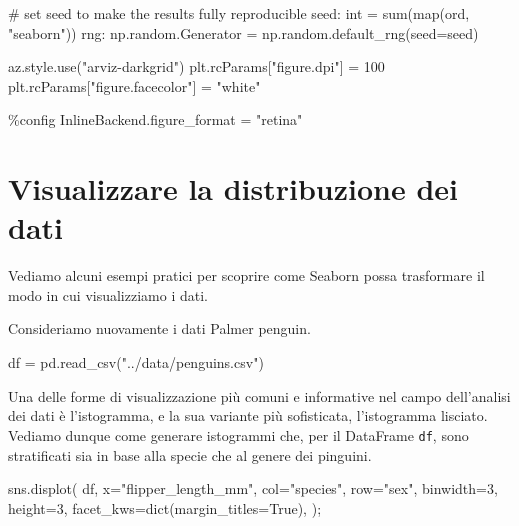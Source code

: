\documentclass[
  letterpaper,
  krantz2]{{[}./krantz{]}}
\newenvironment{Shaded}{\begin{snugshade}}{\end{snugshade}}
\newcommand{\BuiltInTok}[1]{\textcolor[rgb]{0.00,0.23,0.31}{#1}}
\newcommand{\CommentTok}[1]{\textcolor[rgb]{0.37,0.37,0.37}{#1}}
\newcommand{\DecValTok}[1]{\textcolor[rgb]{0.68,0.00,0.00}{#1}}
\newcommand{\NormalTok}[1]{\textcolor[rgb]{0.00,0.23,0.31}{#1}}
\newcommand{\OperatorTok}[1]{\textcolor[rgb]{0.37,0.37,0.37}{#1}}
\newcommand{\StringTok}[1]{\textcolor[rgb]{0.13,0.47,0.30}{#1}}
\newcommand{\VariableTok}[1]{\textcolor[rgb]{0.07,0.07,0.07}{#1}}
\begin{document}
\begin{Shaded}
\begin{Highlighting}[]
\CommentTok{\# set seed to make the results fully reproducible}
\NormalTok{seed: }\BuiltInTok{int} \OperatorTok{=} \BuiltInTok{sum}\NormalTok{(}\BuiltInTok{map}\NormalTok{(}\BuiltInTok{ord}\NormalTok{, }\StringTok{"seaborn"}\NormalTok{))}
\NormalTok{rng: np.random.Generator }\OperatorTok{=}\NormalTok{ np.random.default\_rng(seed}\OperatorTok{=}\NormalTok{seed)}

\NormalTok{az.style.use(}\StringTok{"arviz{-}darkgrid"}\NormalTok{)}
\NormalTok{plt.rcParams[}\StringTok{"figure.dpi"}\NormalTok{] }\OperatorTok{=} \DecValTok{100}
\NormalTok{plt.rcParams[}\StringTok{"figure.facecolor"}\NormalTok{] }\OperatorTok{=} \StringTok{"white"}

\OperatorTok{\%}\NormalTok{config InlineBackend.figure\_format }\OperatorTok{=} \StringTok{"retina"}
\end{Highlighting}
\end{Shaded}

\section{Visualizzare la distribuzione dei
dati}\label{visualizzare-la-distribuzione-dei-dati}

Vediamo alcuni esempi pratici per scoprire come Seaborn possa
trasformare il modo in cui visualizziamo i dati.

Consideriamo nuovamente i dati Palmer penguin.

\begin{Shaded}
\begin{Highlighting}[]
\NormalTok{df }\OperatorTok{=}\NormalTok{ pd.read\_csv(}\StringTok{"../data/penguins.csv"}\NormalTok{)}
\end{Highlighting}
\end{Shaded}

Una delle forme di visualizzazione più comuni e informative nel campo
dell'analisi dei dati è l'istogramma, e la sua variante più sofisticata,
l'istogramma lisciato. Vediamo dunque come generare istogrammi che, per
il DataFrame \texttt{df}, sono stratificati sia in base alla specie che
al genere dei pinguini.

\begin{Shaded}
\begin{Highlighting}[]
\NormalTok{sns.displot(}
\NormalTok{    df, x}\OperatorTok{=}\StringTok{"flipper\_length\_mm"}\NormalTok{, col}\OperatorTok{=}\StringTok{"species"}\NormalTok{, row}\OperatorTok{=}\StringTok{"sex"}\NormalTok{,}
\NormalTok{    binwidth}\OperatorTok{=}\DecValTok{3}\NormalTok{, height}\OperatorTok{=}\DecValTok{3}\NormalTok{, facet\_kws}\OperatorTok{=}\BuiltInTok{dict}\NormalTok{(margin\_titles}\OperatorTok{=}\VariableTok{True}\NormalTok{),}
\NormalTok{)}\OperatorTok{;}
\end{Highlighting}
\end{Shaded}
\end{document}
